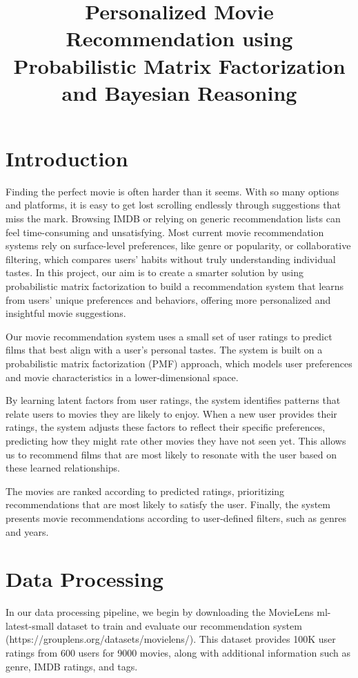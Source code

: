 \documentclass{article}
\title{Personalized Movie Recommendation using Probabilistic Matrix Factorization and Bayesian Reasoning}
\begin{document}
\maketitle

\section{Introduction}
Finding the perfect movie is often harder than it seems. With so many options and platforms, it is easy to get lost scrolling endlessly through suggestions that miss the mark. Browsing IMDB or relying on generic recommendation lists can feel time-consuming and unsatisfying. Most current movie recommendation systems rely on surface-level preferences, like genre or popularity, or collaborative filtering, which compares users' habits without truly understanding individual tastes. In this project, our aim is to create a smarter solution by using probabilistic matrix factorization to build a recommendation system that learns from users' unique preferences and behaviors, offering more personalized and insightful movie suggestions.

Our movie recommendation system uses a small set of user ratings to predict films that best align with a user's personal tastes. The system is built on a probabilistic matrix factorization (PMF) approach, which models user preferences and movie characteristics in a lower-dimensional space.

By learning latent factors from user ratings, the system identifies patterns that relate users to movies they are likely to enjoy. When a new user provides their ratings, the system adjusts these factors to reflect their specific preferences, predicting how they might rate other movies they have not seen yet. This allows us to recommend films that are most likely to resonate with the user based on these learned relationships.

The movies are ranked according to predicted ratings, prioritizing recommendations that are most likely to satisfy the user. Finally, the system presents movie recommendations according to user-defined filters, such as genres and years.

\section{Data Processing}
In our data processing pipeline, we begin by downloading the MovieLens ml-latest-small dataset to train and evaluate our recommendation system (https://grouplens.org/datasets/movielens/). This dataset provides 100K user ratings from 600 users for 9000 movies, along with additional information such as genre, IMDB ratings, and tags.
\end{document}
